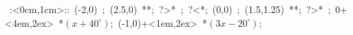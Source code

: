 \hbox{
\xy    <1cm,0cm>:<0cm,1cm>::
       (-2,0) ; (2.5,0) **\dir{-}; ?>* \dir{>}; ?<*\dir{<}; 
       (0,0) ; (1.5,1.25) **\dir{-}; ?>* \dir{>};
       0+<4em,2ex> *{\hbox{$(x+40^{\circ})$}};
       (-1,0)+<1em,2ex> *{\hbox{$(3x-20^{\circ})$}};
       \endxy}
